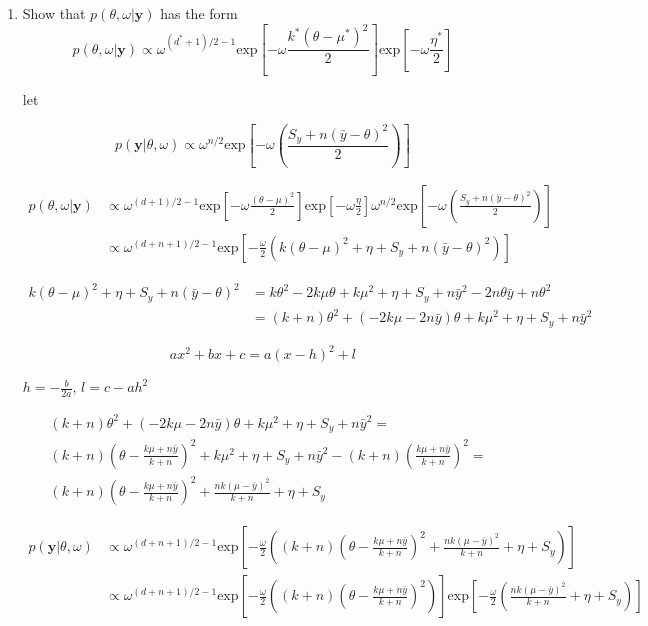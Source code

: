 \documentclass[10pt]{article}
\newcommand{\by}{\mathbf{y}}
\begin{document}
\begin{enumerate}[label=(\Alph*)]
      \item Show that $p(\theta, \omega | \by)$ has the form
        $$p(\theta, \omega| \by) \propto \omega^{(d^* + 1)/2 -1} \text{exp} \left [ -\omega \frac{k^* ( \theta - \mu^*)^2}{2}\right] \text{exp} \left [ -\omega \frac{\eta^*}{2}\right] $$

        let

        $$p(\by| \theta, \omega) \propto \omega^{n/2} \text{exp} \left [ -\omega \left ( \frac{S_y + n (\bar{y} - \theta)^2}{2}\right) \right ]$$

        \begin{align*}
          p(\theta, \omega | \by) &\propto \omega^{(d+1)/2-1} \text{exp}\left [ -\omega \frac{(\theta - \mu)^2}{2}\right] \text{exp}\left [ -\omega \frac{\eta}{2}\right] \omega^{n/2} \text{exp}\left[ -\omega \left( \frac{S_y + n (\bar{y} - \theta)^2}{2}\right)\right] \\
          &\propto \omega^{(d+n+1)/2 - 1}\text{exp}\left[ -\frac{\omega}{2} \left( k(\theta - \mu)^2 + \eta + S_y + n(\bar{y} - \theta)^2\right)\right]
        \end{align*}

        \begin{align*}
          k(\theta - \mu)^2 + \eta + S_y + n(\bar{y} - \theta)^2 &= k \theta^2 - 2 k \mu \theta + k \mu^2 + \eta + S_y + n\bar{y}^2 - 2n \theta \bar{y} + n \theta^2 \\
          &= (k+n) \theta^2 + (-2k\mu - 2n\bar{y}) \theta + k \mu^2 + \eta + S_y + n \bar{y}^2
        \end{align*}

        $$ax^2 + bx + c = a(x - h)^2 + l$$

        $h = -\frac{b}{2a}$, $l = c - a h^2$

        \begin{align*}
          & (k+n) \theta^2 + (-2k\mu - 2n\bar{y}) \theta + k \mu^2 + \eta + S_y + n \bar{y}^2 = \\
          &(k+n) \left( \theta - \frac{k\mu + n\bar{y}}{k+n}\right)^2 + k \mu^2 + \eta + S_y + n \bar{y}^2 - (k+n)\left( \frac{k\mu + n \bar{y}}{k+n}\right)^2 = \\
          & (k+n) \left( \theta - \frac{k\mu + n\bar{y}}{k+n}\right)^2 + \frac{nk(\mu - \bar{y})^2}{k+n} + \eta + S_y
        \end{align*}

        \begin{align*}
          p(\by| \theta, \omega) &\propto \omega^{(d+n+1)/2-1} \text{exp}\left[  -\frac{\omega}{2} \left( (k+n) \left( \theta - \frac{k\mu + n\bar{y}}{k+n}\right)^2 + \frac{nk(\mu - \bar{y})^2}{k+n} + \eta + S_y\right) \right] \\
          & \propto \omega^{(d+n+1)/2-1} \text{exp}\left[  -\frac{\omega}{2} \left( (k+n) \left( \theta - \frac{k\mu + n\bar{y}}{k+n}\right)^2 \right) \right] \text{exp}\left[ - \frac{\omega}{2}\left( \frac{nk(\mu - \bar{y})^2}{k+n} + \eta + S_y\right) \right]
        \end{align*}


\end{enumerate}
\end{document}
